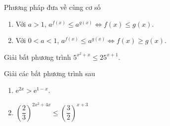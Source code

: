 \begin{dang}{Phương pháp đưa về cùng cơ số}
\begin{enumerate}
	\item Với $a>1$, $a^{f(x)} \le a^{g(x)} \Leftrightarrow f(x) \le g(x)$.
	\item Với $0<a<1$, $a^{f(x)} \le a^{g(x)} \Leftrightarrow f(x) \ge g(x)$.
\end{enumerate}
\end{dang}
\setcounter{vd}{0}
\setcounter{bt}{0}

\begin{vd}%
	Giải bất phương trình $5^{x^2+x}\le 25^{x+1}$.
\end{vd}

\begin{vd}%
	Giải các bất phương trình sau
	\begin{enumerate}
		\item $\mathrm{e}^{2x}>\mathrm{e}^{1-x}$.
		\item $\left(\dfrac{2}{3}\right)^{2x^2+4x} \le \left(\dfrac{3}{2}\right)^{x+3}$
	\end{enumerate}
	\loigiai{
		\begin{enumerate}
			\item $\mathrm{e}^{2x}>\mathrm{e}^{1-x} \Leftrightarrow 2x>1-x \Leftrightarrow x>\dfrac{1}{3}$.\\
			Tập nghiệm $S=\left(\dfrac{1}{3};+\infty\right)$.
			\item $\left(\dfrac{2}{3}\right)^{2x^2+4x} \le \left(\dfrac{3}{2}\right)^{x+3} \Leftrightarrow \left(\dfrac{2}{3}\right)^{2x^2+4x} \le \left(\dfrac{2}{3}\right)^{-x-3} \Leftrightarrow 2x^2+4x\ge -x-3$\\
			$\Leftrightarrow 2x^2+5x+3 \ge 0 \Leftrightarrow x\le -\dfrac{3}{2} \vee x \ge -1$.\\
			Tập nghiệm $S=\left(-\infty;\dfrac{-3}{2}\right]\cup [-1;+\infty)$.
		\end{enumerate}
	}
\end{vd}

